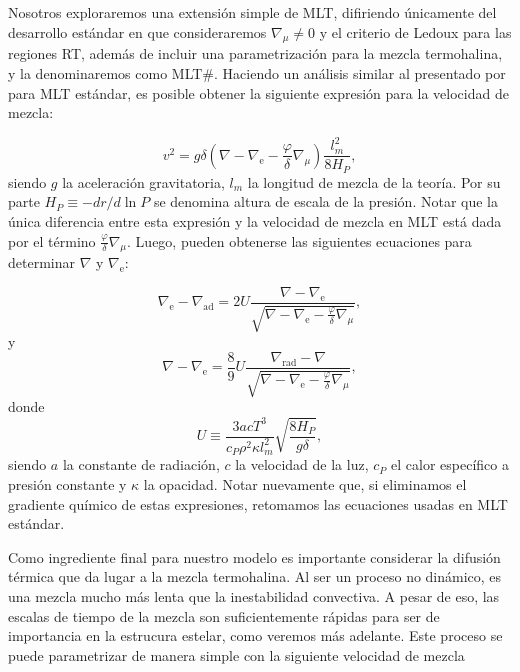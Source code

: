 \documentclass[baaa]{baaa}
\begin{document}
Nosotros exploraremos una extensión simple de MLT, difiriendo únicamente del desarrollo estándar en que consideraremos $\nabla_\mu\neq 0$ y el criterio de Ledoux para las regiones RT, además de incluir una parametrización para la mezcla termohalina, y la denominaremos como MLT\#. Haciendo un análisis similar al presentado por \cite{Kipphenhahn2013} para MLT estándar, es posible obtener la siguiente expresión para la velocidad de mezcla:

\begin{equation}
    v^2=g\delta(\nabla-\nabla_\text{e}-\frac{\varphi}{\delta}\nabla_\mu)\frac{l_m^2}{8H_P},
\end{equation}
siendo $g$ la aceleración gravitatoria, $l_m$ la longitud de mezcla de la teoría. Por su parte $H_P\equiv-dr/d\ln P$ se denomina altura de escala de la presión. Notar que la única diferencia entre esta expresión y la velocidad de mezcla en MLT está dada por el término $\frac{\varphi}{\delta}\nabla_\mu$. Luego, pueden obtenerse las siguientes ecuaciones para determinar $\nabla$ y $\nabla_\text{e}$:

\begin{equation}
    \nabla_\text{e}-\nabla_\text{ad}=2U\frac{\nabla-\nabla_\text{e}}{\sqrt{\nabla-\nabla_\text{e}-\frac{\varphi}{\delta}\nabla_\mu}},
\end{equation}
y
\begin{equation}
    \nabla-\nabla_\text{e}=\frac{8}{9}U\frac{\nabla_\text{rad}-\nabla}{\sqrt{\nabla-\nabla_\text{e}-\frac{\varphi}{\delta}\nabla_\mu}},
\end{equation}
donde
\begin{equation}
    U\equiv\frac{3acT^3}{c_P\rho^2\kappa l_m^2}\sqrt{\frac{8H_P}{g\delta}},
\end{equation}
siendo $a$ la constante de radiación, $c$ la velocidad de la luz, $c_P$ el calor específico a presión constante y $\kappa$ la opacidad. Notar nuevamente que, si eliminamos el gradiente químico de estas expresiones, retomamos las ecuaciones usadas en MLT estándar.


Como ingrediente final para nuestro modelo es importante considerar la difusión térmica que da lugar a la mezcla termohalina. Al ser un proceso no dinámico, es una mezcla mucho más lenta que la inestabilidad convectiva. A pesar de eso, las escalas de tiempo de la mezcla son suficientemente rápidas para ser de importancia en la estrucura estelar, como veremos más adelante. 
Este proceso se puede parametrizar de manera simple con la siguiente velocidad de mezcla \citep{1980A&A....91..175K}
\end{document}
